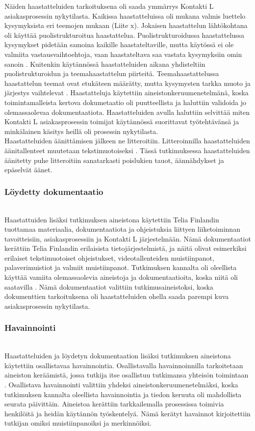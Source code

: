 \documentclass[finnish,12pt,a4paper,pdftex]{article}
\begin{document}
Näiden haastatteluiden tarkoituksena oli saada ymmärrys Kontakti L asiakasprosessin nykytilasta. Kaikissa haastatteluissa oli mukana valmis luettelo kysymyksista eri teemojen mukaan (Liite x). Jokaisen haastattelun lähtökohtana oli käyttää puolistrukturoitua haastattelua. Puolistrukturoidussa haastattelussa kysymykset pidetään samoina kaikille haastateltaville, mutta käytössä ei ole valmiita vastausvaihtoehtoja, vaan haastateltava saa vastata kysymyksiin omin sanoin \citep{eskola}. Kuitenkin käytännössä haastatteluiden aikana yhdisteltiin puolistrukturoidun ja teemahaastattelun piirteitä. Teemahaastattelussa haastattelun teemat ovat etukäteen määrätty, mutta kysymysten tarkka muoto ja järjestys vaihtelevat \citep{eskola}. Haastatteluja käytettiin aineistonkeruumenetelmänä, koska toimintamalleista kertova dokumetaatio oli puutteellista ja haluttiin validoida jo olemassaolevaa dokumentaatiota. Haastatteluiden avulla haluttiin selvittää miten Kontakti L asiakasprosessin toimijat käytännössä suorittavat työtehtävänsä ja minkälainen käsitys heillä oli prosessin nykytilasta.\\

Haastatteluiden äänittämisen jälkeen ne litteroitiin. Litteroinnilla haastatteluiden äänitallenteet muutetaan tekstimuotoiseksi \citep{eskola}. Tässä tutkimuksessa haastatteluiden äänitetty puhe litteroitiin sanatarkasti poislukien tauot, äännähdykset ja epäselvät äänet.

\subsubsection{Löydetty dokumentaatio}\\
Haastattuiden lisäksi tutkimuksen aineistona käytettiin Telia Finlandin tuottamaa materiaalia, dokumentaatiota ja ohjeistuksia liittyen liiketoiminnan tavoitteisiin, asiakasprosessiin ja Kontakti L järjestelmään. Nämä dokumentaatiot kerättiin Telia Finlandin erilaisista tietojärjestelmistä, ja näitä olivat esimerkiksi erilaiset tekstimuotoiset ohjeistukset, videotallenteiden muistiinpanot, palaverimuistiot ja valmiit muistiinpanot.  Tutkimuksen kannalta oli oleellista käyttää vamiita olemassaolevia aineistoja ja dokumentaatioita, koska niitä oli saatavilla \citep{eskola}. Nämä dokumentaatiot valittiin tutkimusaineistoksi, koska dokumenttien tarkoituksena oli haastatteluiden ohella saada parempi kuva asiakasprosessin nykytilasta.

\subsubsection{Havainnointi}\\
Haastatteluiden ja löydetyn dokumentaation lisäksi tutkimuksen aineistona käytettiin osallistavaa havainnointia. Osallistavalla havainnoinnilla tarkoitetaan aineiston keräämistä, jossa tutkija itse osallistuu tutkimansa yhteisön toimintaan \citep{eskola}. 
Osallistava havainnointi valittiin yhdeksi aineistonkeruumenetelmäksi, koska tutkimuksen kannalta oleellista havainnointia ja tiedon keruuta oli mahdollista seurata päivittäin. 
Aineistoa kerättiin tarkkailemalla prosessissa toimivia henkilöitä ja heidän käytännön työskentelyä. Nämä kerätyt havainnot kirjoitettiin tutkijan omiksi muistiinpanoiksi ja merkinnöiksi.
\end{document}
